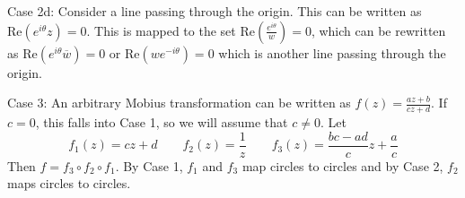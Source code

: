 \documentclass[12pt]{article}
\begin{document}
Case 2d: Consider a line passing through the origin. This can be written as $\mbox{Re}(e^{i \theta} z) = 0$. This is mapped to the set $\mbox{Re}\left(\frac{e^{i \theta}}{w}\right)=0$, which can be rewritten as $\mbox{Re}(e^{i \theta} \overline{w}) = 0$ or $\mbox{Re}(w e^{-i \theta})=0$ which is another line passing through the origin. 

Case 3: An arbitrary Mobius transformation can be written as $f(z) = \frac{az+b}{cz+d}$. If $c=0$, this falls into Case 1, so we will assume that $c \ne 0$. Let 
$$f_1(z) = cz+d \qquad f_2(z) = \frac{1}{z} \qquad 
f_3(z) = \frac{bc-ad}{c}z + \frac{a}{c} $$
Then $f = f_3 \circ f_2 \circ f_1$. By Case 1, $f_1$ and $f_3$ map circles to circles and by Case 2, $f_2$ maps circles to circles.
\end{document}

